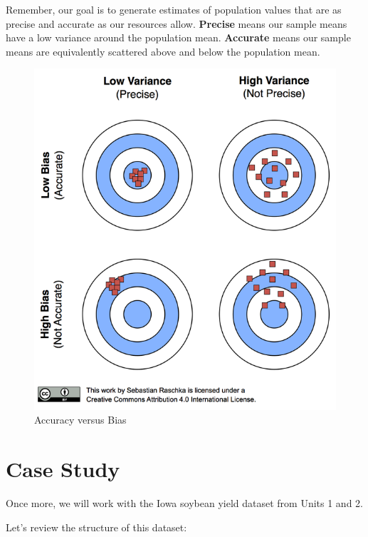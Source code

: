 \documentclass[
]{book}
\begin{document}
Remember, our goal is to generate estimates of population values that
are as precise and accurate as our resources allow. \textbf{Precise} means
our sample means have a low variance around the population mean.
\textbf{Accurate} means our sample means are equivalently scattered above and
below the population mean.

\begin{figure}
\centering
\includegraphics{data-unit-3/bias_v_accuracy.png}
\caption{Accuracy versus Bias}
\end{figure}

\hypertarget{case-study-1}{%
\section{Case Study}\label{case-study-1}}

Once more, we will work with the Iowa soybean yield dataset from Units 1
and 2.

Let's review the structure of this dataset:
\end{document}
